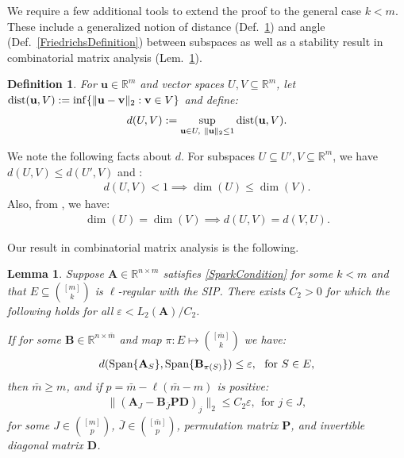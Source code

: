 \documentclass[9pt,twocolumn]{pnas-new}
\newtheorem{lemma}{Lemma}
\newtheorem{definition}{Definition}
\begin{document}
We require a few additional tools to extend the proof to the general case $k < m$. These include a generalized notion of distance (Def.~\ref{dDef}) and angle (Def.~\ref{FriedrichsDefinition}) between subspaces as well as a stability result in combinatorial matrix analysis (Lem.~\ref{MainLemma}).

\begin{definition}\label{dDef}
For $\mathbf{u} \in \mathbb R^m$ and vector spaces $U,V \subseteq \mathbb{R}^m$, let $\text{\rm dist}(\mathbf{u}, V) := \inf \{\| \mathbf{u}-\mathbf{v} \|_2: \mathbf{v} \in V\}$ and define:
\begin{align}\label{d}
d(U,V) := \sup_{\mathbf{u} \in U, \ \|\mathbf{u}\|_2 \leq 1} \text{\rm dist}(\mathbf{u},V).
\end{align}
\end{definition}

We note the following facts about $d$. For subspaces $U \subseteq U', V \subseteq \mathbb{R}^m$, we have $d(U,V) \leq d(U',V)$ and \cite[Cor.~2.6]{Kato2013}:
\begin{align}\label{dimLem}
d(U,V) < 1 \implies \dim(U) \leq \dim(V).
\end{align}
Also, from \cite[Lem.~3.2]{Morris10}, we have:
\begin{align}\label{eqdim}
\dim(U) = \dim(V) \implies d(U,V) = d(V,U).
\end{align}

Our result in combinatorial matrix analysis is the following.

\begin{lemma}\label{MainLemma}
Suppose $\mathbf{A} \in \mathbb{R}^{n \times m}$ satisfies \eqref{SparkCondition} for some $k < m$ and that $E \subseteq {[m] \choose k}$ is $\ell$-regular with the SIP. There exists $C_2 > 0$ for which the following holds for all $\varepsilon < L_2(\mathbf{A}) / C_2$. 


If for some  $\mathbf{B} \in \mathbb{R}^{n \times \bar m}$ and map $\pi: E \mapsto {[\bar m] \choose k}$ we have:
\begin{align}\label{GapUpperBound}
d(\text{\rm Span}\{\mathbf{A}_{S}\}, \text{\rm Span}\{\mathbf{B}_{\pi(S)}\}) \leq \varepsilon, \ \  \text{for $S \in E$},
\end{align}
then $\bar m \geq m$, and if $p = \bar m - \ell(\bar m - m)$ is positive:
\begin{align}\label{MainLemmaBPD}
\|(\mathbf{A}_J - \mathbf{B}_{\bar J}\mathbf{PD})_j\|_2 \leq C_2 \varepsilon, \ \  \text{for } j \in J,
\end{align}
for some $J \in {[m] \choose p}$, $\bar J \in {[\bar m] \choose p}$, permutation matrix $\mathbf{P}$, and invertible diagonal matrix $\mathbf{D}$.
\end{lemma}
\end{document}
